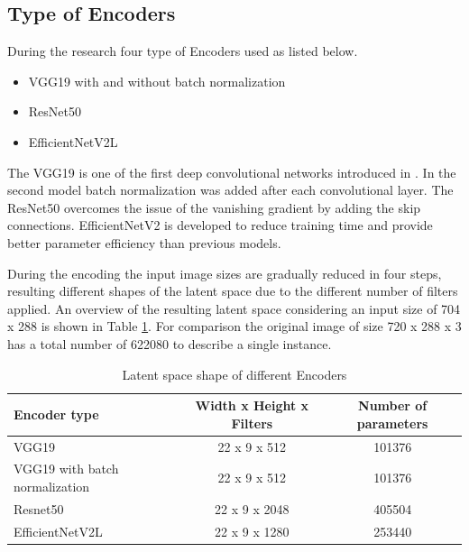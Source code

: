 \subsection{Type of Encoders}
During the research four type of Encoders used as listed below.

\begin{itemize}
    \item VGG19 with and without batch normalization
    \item ResNet50
    \item EfficientNetV2L
\end{itemize}

The VGG19 is one of the first deep convolutional networks introduced in \cite{simonyan_very_2015}.
In the second model batch normalization was added after each convolutional layer.
The ResNet50 \cite{he_deep_2015} overcomes the issue of the vanishing gradient
by adding the skip connections.
EfficientNetV2 \cite{tan_efficientnetv2_2021} is developed to reduce training time
and provide better parameter efficiency than previous models.

During the encoding the input image sizes are gradually reduced in four steps,
resulting different shapes of the latent space due to the different number of filters applied.
An overview of the resulting latent space considering an input size of 704 x 288
is shown in Table \ref{table:latent_space_shape}.
For comparison the original image of size 720 x 288 x 3 has a total number of 622080 to describe
a single instance.

\begin{table}[!ht]
    \centering
    \begin{tabular}{l c c}
        Encoder type                   & Width x Height x Filters & Number of parameters \\
        \hline
        VGG19                          & 22 x 9 x 512             & 101376               \\
        VGG19 with batch normalization & 22 x 9 x 512             & 101376               \\
        Resnet50                       & 22 x 9 x 2048            & 405504               \\
        EfficientNetV2L                & 22 x 9 x 1280            & 253440               \\
    \end{tabular}
    \caption{Latent space shape of different Encoders}
    \label{table:latent_space_shape}
\end{table}


